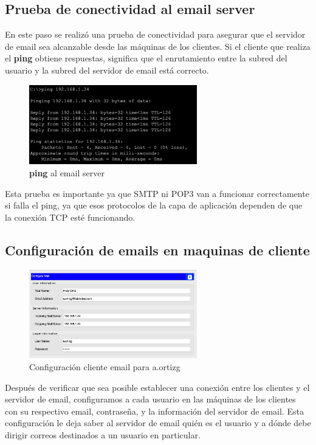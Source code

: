 \documentclass[10pt]{article}
\begin{document}
\subsection{Prueba de conectividad al email server}
En este paso se realizó una prueba de conectividad para asegurar que el servidor de email sea alcanzable desde las máquinas de los clientes. Si el cliente que realiza el \textbf{ping} obtiene respuestas, significa que el enrutamiento entre la subred del usuario y la subred del servidor de email está correcto.

\begin{figure}[H]
    \centering
    \includegraphics[width=0.65\textwidth]{lab-01-screenshots/45-2-ping-email}
    \caption{\textbf{ping} al email server}
\end{figure}

Esta prueba es importante ya que SMTP ni POP3 van a funcionar correctamente si falla el ping, ya que esos protocolos de la capa de aplicación dependen de que la conexión TCP esté funcionando.

\subsection{Configuración de emails en maquinas de cliente}

\begin{figure}[H]
    \centering
    \includegraphics[width=0.65\textwidth]{lab-01-screenshots/45-3-client-config.png}
    \caption{Configuración cliente email para a.ortizg}
\end{figure}

Después de verificar que sea posible establecer una conexión entre los clientes y el servidor de email, configuramos a cada usuario en las máquinas de los clientes con su respectivo email, contraseña, y la información del servidor de email. Esta configuración le deja saber al servidor de email quién es el usuario y a dónde debe dirigir correos destinados a un usuario en particular.
\end{document}
